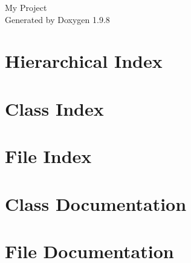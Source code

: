 \documentclass[twoside]{book}
\newcommand{\+}{\discretionary{\mbox{\scriptsize$\hookleftarrow$}}{}{}}
\newcommand{\clearemptydoublepage}{%
    \newpage{\pagestyle{empty}\cleardoublepage}%
  }
\begin{document}
  \raggedbottom
    \hypersetup{pageanchor=false,
                bookmarksnumbered=true,
                pdfencoding=unicode
               }
  \begin{titlepage}
  \vspace*{7cm}
  \begin{center}%
  {\Large My Project}\\
  \vspace*{1cm}
  {\large Generated by Doxygen 1.9.8}\\
  \end{center}
  \end{titlepage}
  \clearemptydoublepage
  \tableofcontents
  \clearemptydoublepage
  \hypersetup{pageanchor=true}
\chapter{Hierarchical Index}

\chapter{Class Index}

\chapter{File Index}

\chapter{Class Documentation}




\chapter{File Documentation}




  \backmatter
  \newpage
  \clearemptydoublepage
  \printindex
\end{document}
